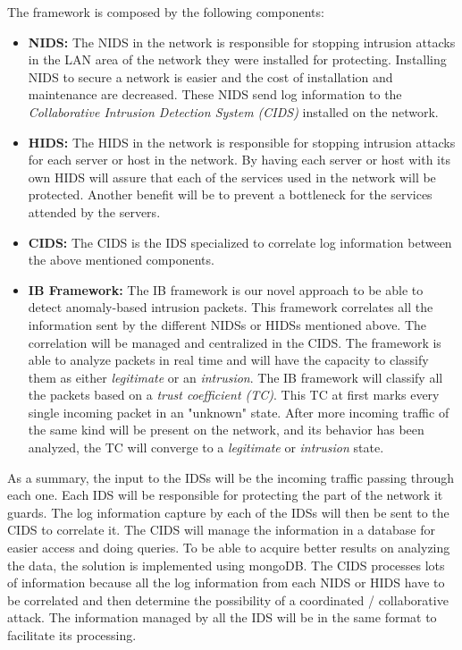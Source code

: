 \documentclass[conference]{IEEEtran}
\begin{document}
The framework is composed by the following components:
\begin{itemize}
\item \textbf{NIDS:} The NIDS in the network is responsible for stopping intrusion attacks in the LAN area of the network they were installed for protecting. Installing NIDS to secure a network is easier and the cost of installation and maintenance are decreased. These NIDS send log information to the \emph{Collaborative Intrusion Detection System (CIDS)} installed on the network.
\item \textbf{HIDS:} The HIDS in the network is responsible for stopping intrusion attacks for each server or host in the network. By having each server or host with its own HIDS will assure that each of the services used in the network will be protected. Another benefit will be to prevent a bottleneck for the services attended by the servers.
\item \textbf{CIDS:} The CIDS is the IDS specialized to correlate log information between the above mentioned components.
\item \textbf{IB Framework:} The IB framework is our novel approach to be able to detect anomaly-based intrusion packets. This framework correlates all the information sent by the different NIDSs or HIDSs mentioned above. The correlation will be managed and centralized in the CIDS. The framework is able to analyze packets in real time and will have the capacity to classify them as either \emph{legitimate } or an \emph{intrusion}. The IB framework will classify all the packets based on a \emph{trust coefficient (TC)}. This TC at first marks every single incoming packet in an "unknown" state. After more incoming traffic of the same kind will be present on the network, and its behavior has been analyzed, the TC will converge to a \emph{legitimate} or \emph{intrusion} state.
\end{itemize}

As a summary, the input to the IDSs will be the incoming traffic passing through each one.  Each IDS will be responsible for protecting the part of the network it guards. The log information capture by each of the IDSs will then be sent to the CIDS to correlate it.  The CIDS will manage the information in a database for easier access and doing queries. To be able to acquire better results on analyzing the data, the solution is implemented using mongoDB. The CIDS processes lots of information because all the log information from each NIDS or HIDS have to be correlated and then determine the possibility of a coordinated / collaborative attack.  The information managed by all the IDS will be in the same format to facilitate its processing. %
\end{document}
